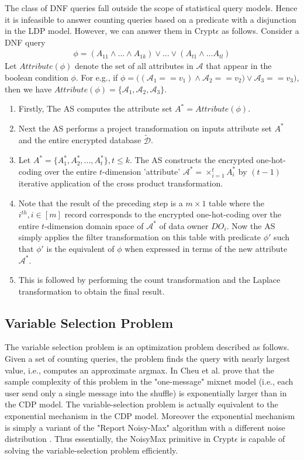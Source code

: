 The class of DNF queries fall outside the scope of statistical query models. Hence it is infeasible to answer counting queries based on a predicate with a disjunction in the LDP model. However, we can answer them in Crypt$\epsilon$ as follows.
Consider a DNF query 
\begin{gather}\phi = (A_{11}\land ...\land A_{1k}) \vee ... \vee (A_{t1}\land ... A_{tl}) \end{gather}
Let $Attribute(\phi)$ denote the set of all attributes in $\mathcal{A}$ that appear in the boolean condition $\phi$. For e.g., if $\phi = \big((\mathcal{A}_1==v_1) \land \mathcal{A}_2==v_2) \vee \mathcal{A}_3==v_3 \big)$, then  we have $Attribute(\phi)=\{\mathcal{A}_1, \mathcal{A}_2,\mathcal{A}_3\}$. \begin{enumerate}\item Firstly, The AS computes the attribute set $A^*=Attribute(\phi)$.
\item Next the AS performs a project transformation on inputs attribute set $A^*$ and the entire encrypted database $\boldsymbol{\tilde{\mathcal{D}}}$. 
\item Let $A^*= \{A^*_1,A^*_2,\ldots,A^*_t\}, t \leq k$. The AS constructs the encrypted one-hot-coding over the entire $t$-dimension 'attribute' $\mathcal{A}^*=\times_{i=1}^t A^*_i$ by $(t-1)$ iterative application of the cross product transformation. 
\item Note that the result of the preceding step is a $m\times 1$ table where the $i^{th} , i \in [m]$ record corresponds to the encrypted one-hot-coding over the entire $t$-dimension domain space of $\mathcal{A}^*$ of data owner $DO_i$. Now the AS simply applies the filter transformation on this table with predicate $\phi'$  such that $\phi'$ is the equivalent of $\phi$ when expressed in terms of the new  attribute $\mathcal{A}^*$.
\item This is followed by performing the count transformation and the Laplace transformation to obtain the final result. 
\end{enumerate}
\subsection*{Variable Selection Problem} The variable selection problem is an optimization problem described as follows. Given a set of counting queries, the problem finds the query with nearly largest value, i.e., computes an approximate argmax. In \cite{mixnet} Cheu et al. prove that the sample complexity of this problem in the "one-message" mixnet model (i.e., each user send only a single message into the shuffle) is exponentially larger than in the CDP model. The variable-selection problem is actually equivalent to the exponential mechanism\cite{Dork} in the CDP model. Moreover the exponential mechanism is simply a variant of the "Report Noisy-Max" algorithm with a different noise distribution \cite{Nm}. Thus essentially, the NoisyMax primitive in Crypt$\epsilon$ is capable of solving the variable-selection problem efficiently. 
